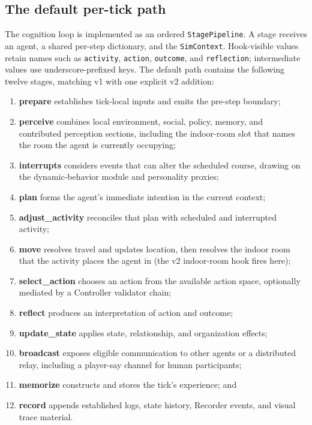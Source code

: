 \subsection{The default per-tick path}
\label{sec:lifecycle:pipeline}

The cognition loop is implemented as an ordered \texttt{StagePipeline}.  A
stage receives an agent, a shared per-step dictionary, and the
\texttt{SimContext}.  Hook-visible values retain names such as
\texttt{activity}, \texttt{action}, \texttt{outcome}, and \texttt{reflection};
intermediate values use underscore-prefixed keys.  The default path contains
the following twelve stages, matching v1 with one explicit v2 addition:

\begin{enumerate}[leftmargin=*,label=\arabic*.]
  \item \textbf{prepare} establishes tick-local inputs and emits the pre-step
  boundary;
  \item \textbf{perceive} combines local environment, social, policy, memory,
  and contributed perception sections, including the indoor-room slot that
  names the room the agent is currently occupying;
  \item \textbf{interrupts} considers events that can alter the scheduled
  course, drawing on the dynamic-behavior module and personality proxies;
  \item \textbf{plan} forms the agent's immediate intention in the current
  context;
  \item \textbf{adjust\_activity} reconciles that plan with scheduled and
  interrupted activity;
  \item \textbf{move} resolves travel and updates location, then resolves the
  indoor room that the activity places the agent in (the v2 indoor-room
  hook fires here);
  \item \textbf{select\_action} chooses an action from the available action
  space, optionally mediated by a Controller validator chain;
  \item \textbf{reflect} produces an interpretation of action and outcome;
  \item \textbf{update\_state} applies state, relationship, and organization
  effects;
  \item \textbf{broadcast} exposes eligible communication to other agents or
  a distributed relay, including a player-say channel for human participants;
  \item \textbf{memorize} constructs and stores the tick's experience; and
  \item \textbf{record} appends established logs, state history, Recorder
  events, and visual trace material.
\end{enumerate}


